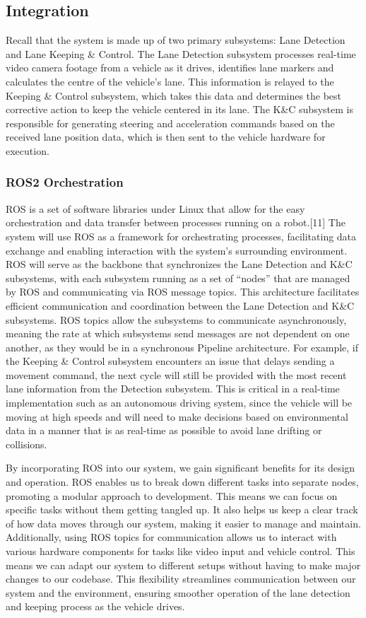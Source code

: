 \documentclass[titlepage]{article}
\begin{document}
\subsection{Integration}
Recall that the system is made up of two primary subsystems: Lane Detection and Lane Keeping \& Control. The Lane Detection subsystem processes real-time video camera footage from a vehicle as it drives, identifies lane markers and calculates the centre of the vehicle’s lane. This information is relayed to the Keeping \& Control subsystem, which takes this data and determines the best corrective action to keep the vehicle centered in its lane. The K\&C subsystem is responsible for generating steering and acceleration commands based on the received lane position data, which is then sent to the vehicle hardware for execution. 


\subsubsection{ROS2 Orchestration}
ROS is a set of software libraries under Linux that allow for the easy orchestration and data transfer between processes running on a robot.[11] The system will use ROS as a framework for orchestrating processes, facilitating data exchange and enabling interaction with the system’s surrounding environment. ROS will serve as the backbone that synchronizes the Lane Detection and K\&C subsystems, with each subsystem running as a set of “nodes” that are managed by ROS and communicating via ROS message topics. This architecture facilitates efficient communication and coordination between the Lane Detection and K\&C subsystems. ROS topics allow the subsystems to communicate asynchronously, meaning the rate at which subsystems send messages are not dependent on one another, as they would be in a synchronous Pipeline architecture. For example, if the Keeping \& Control subsystem encounters an issue that delays sending a movement command, the next cycle will still be provided with the most recent lane information from the Detection subsystem. This is critical in a real-time implementation such as an autonomous driving system, since the vehicle will be moving at high speeds and will need to make decisions based on environmental data in a manner that is as real-time as possible to avoid lane drifting or collisions.

By incorporating ROS into our system, we gain significant benefits for its design and operation. ROS enables us to break down different tasks into separate nodes, promoting a modular approach to development. This means we can focus on specific tasks without them getting tangled up. It also helps us keep a clear track of how data moves through our system, making it easier to manage and maintain. Additionally, using ROS topics for communication allows us to interact with various hardware components for tasks like video input and vehicle control. This means we can adapt our system to different setups without having to make major changes to our codebase. This flexibility streamlines communication between our system and the environment, ensuring smoother operation of the lane detection and keeping process as the vehicle drives.
\end{document}
